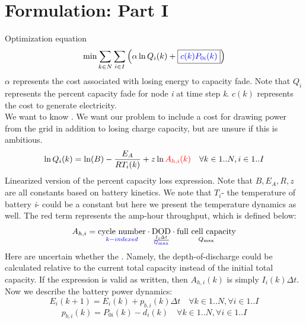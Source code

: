 \documentclass{article}
\begin{document}
	
\section{Formulation: Part I}
Optimization equation
\begin{equation}\label{eq1}
	\text{min}\sum_{k\in N}\sum_{i\in I}\begin{pmatrix}\alpha \ln{Q_i(k)} + \boxed{\color{blue}c(k)P_{0i}(k)\color{black}} \end{pmatrix}
\end{equation}
$\alpha$ represents the cost associated with losing energy to capacity fade. Note that $Q_i$ represents the percent capacity fade for node \textit{i} at time step \textit{k}. $c(k)$ represents the cost to generate electricity. \\
We want to know  . We want our problem to include a cost for drawing power from the grid in addition to losing charge capacity, but are unsure if this is ambitious. 
\begin{equation}\label{eq2}
	\ln{Q_i(k)} = \ln(B) - \frac{E_A}{RT_i(k)} + z\ln{\color{red}A_{h,i}(k)\color{black}} \quad \forall k\in 1..N, i\in 1..I
\end{equation}
Linearized version of the percent capacity loss expression. Note that $B, E_A, R, z$ are all constants based on battery kinetics. We note that $T_i$- the temperature of battery \textit{i}- could be a constant but here we present the temperature dynamics as well. The \color{red}red \color{black} term represents the amp-hour throughput, which is defined below:
\begin{equation}\label{eq3}
	A_{h,i} = \underset{\color{blue}k-indexed\color{black}}{\text{cycle number}}\cdot\underset{\frac{I_i\Delta t}{\color{blue}Q_{\text{max}}\color{black}}}{\text{DOD}}\cdot\underset{Q_{\text{max}}}{\text{full cell capacity}}
\end{equation}
Here are uncertain whether the . Namely, the depth-of-discharge could be calculated relative to the current total capacity instead of the initial total capacity. If the expression is valid as written, then $A_{h,i}(k)$ is simply $I_i(k)\Delta t$. Now we describe the battery power dynamics:
\begin{equation}\label{eq4}
	E_i(k+1) = E_i(k) + p_{b,i}(k)\Delta t \quad \forall k\in 1..N, \forall i\in 1..I
\end{equation}
\begin{equation}\label{eq5}
	p_{b,i}(k) = P_{0i}(k) - d_i(k) \quad \forall k\in 1..N, \forall i\in 1..I
\end{equation}
\end{document}
